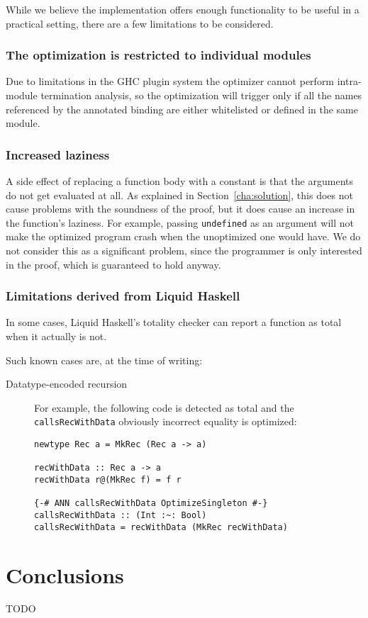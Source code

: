 While we believe the implementation offers enough functionality to be useful in a practical setting, there are a few limitations to be considered.

\subsection{The optimization is restricted to individual modules}
\label{subsec:single-module}

Due to limitations in the GHC plugin system the optimizer cannot perform intra-module termination analysis, so the optimization will trigger only if all the names referenced by the annotated binding are either whitelisted or defined in the same module.

\subsection{Increased laziness}
\label{subsec:limitations-laziness}

A side effect of replacing a function body with a constant is that the arguments do not get evaluated at all.
As explained in Section~\ref{cha:solution}, this does not cause problems with the soundness of the proof, but it does cause an increase in the function's laziness.
For example, passing \texttt{undefined} as an argument will not make the optimized program crash when the unoptimized one would have.
We do not consider this as a significant problem, since the programmer is only interested in the proof, which is guaranteed to hold anyway.

\subsection{Limitations derived from Liquid Haskell}
\label{subsec:limitations-lh}

In some cases, Liquid Haskell's totality checker can report a function as total when it actually is not.

Such known cases are, at the time of writing:

\begin{description}
  \item[Datatype-encoded recursion]
    For example, the following code is detected as total and the \texttt{callsRecWithData} obviously incorrect equality is optimized:
    \begin{lstlisting}
newtype Rec a = MkRec (Rec a -> a)

recWithData :: Rec a -> a
recWithData r@(MkRec f) = f r

{-# ANN callsRecWithData OptimizeSingleton #-}
callsRecWithData :: (Int :~: Bool)
callsRecWithData = recWithData (MkRec recWithData)
    \end{lstlisting}
\end{description}

\chapter{Conclusions}
\label{cha:conclusions}

TODO

